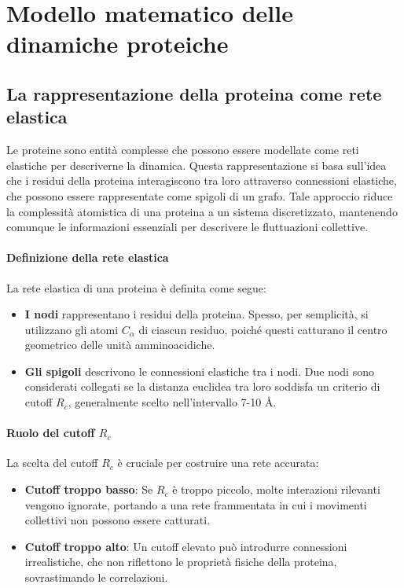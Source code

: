 \documentclass[Lau,binding=0.6cm,oneside,noexaminfo]{sapthesis}
\begin{document}
\section{Modello matematico delle dinamiche proteiche}

\subsection{La rappresentazione della proteina come rete elastica}

Le proteine sono entità complesse che possono essere modellate come reti elastiche per descriverne la dinamica. Questa rappresentazione si basa sull’idea che i residui della proteina interagiscono tra loro attraverso connessioni elastiche, che possono essere rappresentate come spigoli di un grafo. Tale approccio riduce la complessità atomistica di una proteina a un sistema discretizzato, mantenendo comunque le informazioni essenziali per descrivere le fluttuazioni collettive.

\paragraph{Definizione della rete elastica}
La rete elastica di una proteina è definita come segue:
\begin{itemize}
    \item \textbf{I nodi} rappresentano i residui della proteina. Spesso, per semplicità, si utilizzano gli atomi $C_\alpha$ di ciascun residuo, poiché questi catturano il centro geometrico delle unità amminoacidiche.
    \item \textbf{Gli spigoli} descrivono le connessioni elastiche tra i nodi. Due nodi sono considerati collegati se la distanza euclidea tra loro soddisfa un criterio di cutoff $R_c$, generalmente scelto nell’intervallo 7-10 Å.
\end{itemize}

\paragraph{Ruolo del cutoff $R_c$}
La scelta del cutoff $R_c$ è cruciale per costruire una rete accurata:
\begin{itemize}
    \item \textbf{Cutoff troppo basso}: Se $R_c$ è troppo piccolo, molte interazioni rilevanti vengono ignorate, portando a una rete frammentata in cui i movimenti collettivi non possono essere catturati.
    \item \textbf{Cutoff troppo alto}: Un cutoff elevato può introdurre connessioni irrealistiche, che non riflettono le proprietà fisiche della proteina, sovrastimando le correlazioni.
\end{itemize}
\end{document}
